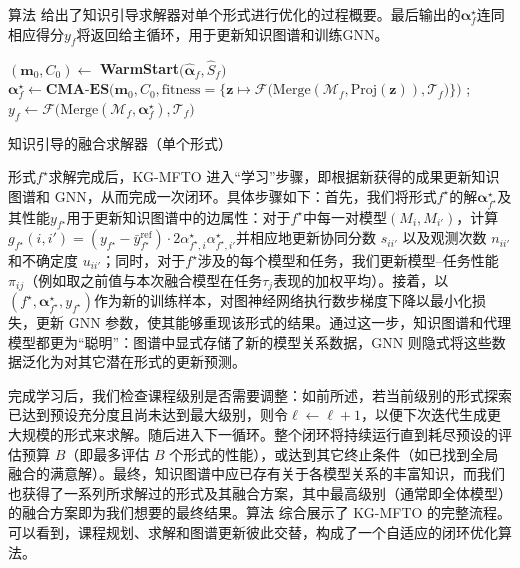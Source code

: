 \documentclass[../main.tex]{subfiles}
\begin{document}
算法 给出了知识引导求解器对单个形式进行优化的过程概要。最后输出的$\boldsymbol{\alpha}^\star_f$连同相应得分$y_f$将返回给主循环，用于更新知识图谱和训练GNN。

\begin{algorithm}[tb]
	\small
	\DontPrintSemicolon
	$(\mathbf{m}_0,C_0)\leftarrow$ \textbf{WarmStart}$\big(\hat{\boldsymbol{\alpha}}_f, \hat{S}_f\big)$
	$\displaystyle \boldsymbol{\alpha}^\star_f \leftarrow \textbf{CMA-ES}\Big(\mathbf{m}_0, C_0, \text{fitness}= \big\{\mathbf{z} \mapsto \mathcal{F}\big(\mathrm{Merge}(\mathcal{M}_f, \mathrm{Proj}(\mathbf{z})), \mathcal{T}_f\big)\big\}\Big)$ ;
	$y_f \leftarrow \mathcal{F}\Big(\mathrm{Merge}(\mathcal{M}_f, \boldsymbol{\alpha}^\star_f), \mathcal{T}_f\Big)$
	\caption{知识引导的融合求解器（单个形式）}
	\label{alg:solver}
\end{algorithm}

形式$f^\star$求解完成后，KG-MFTO 进入“学习”步骤，即根据新获得的成果更新知识图谱和 GNN，从而完成一次闭环。具体步骤如下：首先，我们将形式$f^\star$的解$\boldsymbol{\alpha}^\star_{f^\star}$及其性能$y_{f^\star}$用于更新知识图谱中的边属性：对于$f^\star$中每一对模型$(M_i,M_{i'})$，计算$g_{f^\star}(i,i')=(y_{f^\star}-\bar{y}^{\text{ref}}_{f^\star})\cdot 2\alpha^\star_{f^\star,i}\alpha^\star_{f^\star,i'}$并相应地更新协同分数 $s_{ii'}$ 以及观测次数 $n_{ii'}$ 和不确定度 $u_{ii'}$；同时，对于$f^\star$涉及的每个模型和任务，我们更新模型--任务性能$\pi_{ij}$（例如取之前值与本次融合模型在任务$\tau_j$表现的加权平均）。接着，以$(f^\star,\boldsymbol{\alpha}^\star_{f^\star},y_{f^\star})$作为新的训练样本，对图神经网络执行数步梯度下降以最小化损失，更新 GNN 参数，使其能够重现该形式的结果。通过这一步，知识图谱和代理模型都更为“聪明”：图谱中显式存储了新的模型关系数据，GNN 则隐式将这些数据泛化为对其它潜在形式的更新预测。

完成学习后，我们检查课程级别是否需要调整：如前所述，若当前级别的形式探索已达到预设充分度且尚未达到最大级别，则令$\ell \leftarrow \ell+1$，以便下次迭代生成更大规模的形式来求解。随后进入下一循环。整个闭环将持续运行直到耗尽预设的评估预算 $B$（即最多评估 $B$ 个形式的性能），或达到其它终止条件（如已找到全局融合的满意解）。最终，知识图谱中应已存有关于各模型关系的丰富知识，而我们也获得了一系列所求解过的形式及其融合方案，其中最高级别（通常即全体模型）的融合方案即为我们想要的最终结果。算法 综合展示了 KG-MFTO 的完整流程。可以看到，课程规划、求解和图谱更新彼此交替，构成了一个自适应的闭环优化算法。
\end{document}
